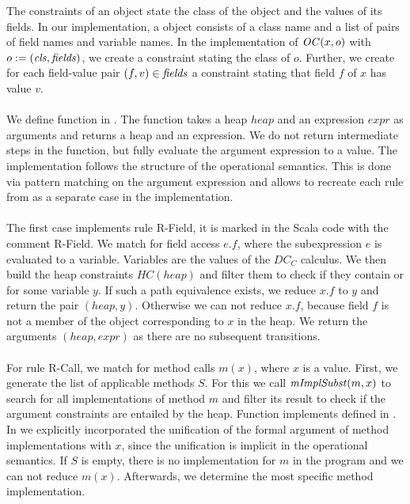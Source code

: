 The constraints of an object state the class of the object
and the values of its fields.
In our implementation, a object consists of a class name
and a list of pairs of field names and variable names.
In the implementation of $\mathit{OC}(x, o)$ with $o := (\mathit{cls}, \mathit{fields})$,
we create a constraint  stating the class of $o$.
Further, we create for each field-value pair $(f, v) \in \mathit{fields}$
a constraint  stating that field $f$ of $x$ has value $v$.
\\
\\
We define function  in .
The function takes a heap $heap$ and an expression $expr$
as arguments and returns a heap and an expression.
We do not return intermediate steps in the function,
but fully evaluate the argument expression to a value.
The implementation follows the structure of the operational
semantics.
This is done via pattern matching on the argument expression
and allows to recreate each rule from 
as a separate case in the implementation.\\
\\
The first case implements rule R-Field,
it is marked in the Scala code with the comment R-Field.
We match for field access $e.f$, where the subexpression $e$
is evaluated to a variable.
Variables are the values of the $DC_C$ calculus.
We then build the heap constraints $HC(heap)$
and filter them to check if they contain 
or  for some variable $y$.
If such a path equivalence exists, we
reduce $x.f$ to $y$ and return
the pair $(heap, y)$.
Otherwise we can not reduce $x.f$,
because field $f$ is not a member of the object
corresponding to $x$ in the heap.
We return the arguments $(heap, expr)$
as there are no subsequent transitions.\\
\\
For rule R-Call, we match for method calls $m(x)$,
where $x$ is a value.
First, we generate the list of applicable methods $S$.
For this we call $\mathit{mImplSubst}(m, x)$
to search for all implementations of method $m$
and filter its result to check if the
argument constraints are entailed by the heap.
Function  implements 
defined in .
In  we explicitly incorporated the unification
of the formal argument of method implementations with $x$,
since the unification is implicit in the operational semantics.
If $S$ is empty, there is no implementation for $m$ in the program
and we can not reduce $m(x)$.
Afterwards, we determine the most specific method implementation.
